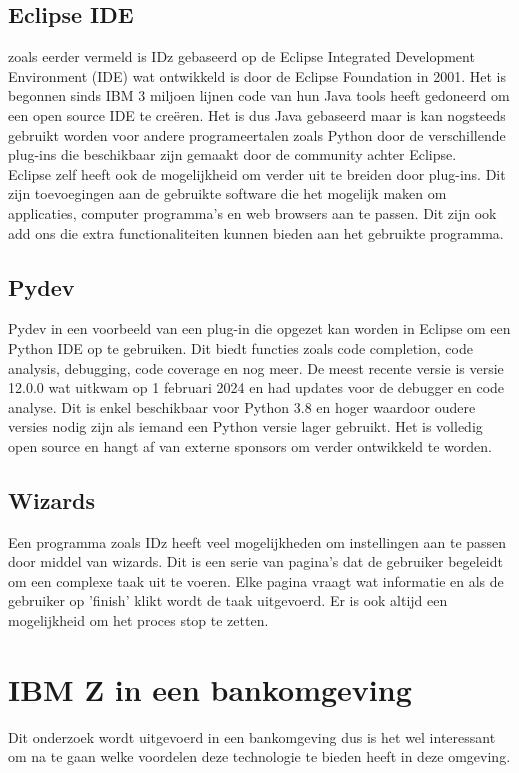 \subsection{Eclipse IDE}
zoals eerder vermeld is IDz gebaseerd op de Eclipse Integrated Development Environment (IDE) wat ontwikkeld is door de Eclipse Foundation in 2001. Het is begonnen sinds IBM 3 miljoen lijnen code van hun Java tools heeft gedoneerd om een open source IDE te creëren. Het is dus Java gebaseerd maar is kan nogsteeds gebruikt worden voor andere programeertalen zoals Python door de verschillende plug-ins die beschikbaar zijn gemaakt door de community achter Eclipse. \autocite{Hanna2021} \\

Eclipse zelf heeft ook de mogelijkheid om verder uit te breiden door plug-ins. Dit zijn toevoegingen aan de gebruikte software die het mogelijk maken om applicaties, computer programma's en web browsers aan te passen. Dit zijn ook add ons die extra functionaliteiten kunnen bieden aan het gebruikte programma. \autocite{George2021} 

\subsection{Pydev}
Pydev in een voorbeeld van een plug-in die opgezet kan worden in Eclipse om een Python IDE op te gebruiken.  Dit biedt functies zoals code completion, code analysis, debugging, code coverage en nog meer. De meest recente versie is versie 12.0.0 wat uitkwam op 1 februari 2024 en had updates voor de debugger en code analyse. Dit is enkel beschikbaar voor Python 3.8 en hoger waardoor oudere versies nodig zijn als iemand een Python versie lager gebruikt. Het is volledig open source en hangt af van externe sponsors om verder ontwikkeld te worden. \autocite{Pydev2024}

\subsection{Wizards}
Een programma zoals IDz heeft veel mogelijkheden om instellingen aan te passen door middel van wizards. Dit is een serie van pagina's dat de gebruiker begeleidt om een complexe taak uit te voeren. Elke pagina vraagt wat informatie en als de gebruiker op 'finish' klikt wordt de taak uitgevoerd. Er is ook altijd een mogelijkheid om het proces stop te zetten. \autocite{Eclipse2006}

\section{IBM Z in een bankomgeving}
Dit onderzoek wordt uitgevoerd in een bankomgeving dus is het wel interessant om na te gaan welke voordelen deze technologie te bieden heeft in deze omgeving. \\ 

